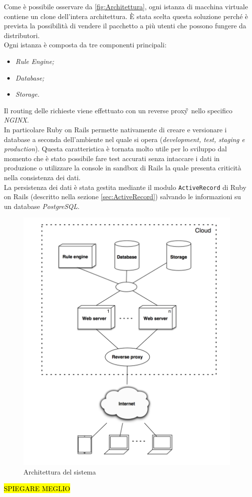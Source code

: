 Come è possibile osservare da \autoref{fig:Architettura}, ogni istanza di macchina virtuale contiene un clone dell'intera architettura. È stata scelta questa soluzione perché è prevista la possibilità di vendere il pacchetto a più utenti che possono fungere da distributori.\\
Ogni istanza è composta da tre componenti principali:
\begin{itemize}
	\item \textit{Rule Engine;}
	\item \textit{Database;}
	\item \textit{Storage.}
\end{itemize}
Il routing delle richieste viene effettuato con un \gls{reverse proxy}\G\, nello specifico \textit{NGINX}. \\
In particolare Ruby on Rails permette nativamente di creare e versionare i database a seconda dell'ambiente nel quale si opera (\textit{development, test, staging e production}). Questa caratteristica è tornata molto utile per lo sviluppo dal momento che è stato possibile fare test accurati senza intaccare i dati in produzione o utilizzare la console in sandbox di Rails la quale presenta criticità nella consistenza dei dati. \\
La persistenza dei dati è stata gestita mediante il modulo \texttt{ActiveRecord} di Ruby on Rails (descritto nella sezione \ref{sec:ActiveRecord}) salvando le informazioni su un database \textit{ PostgreSQL}.
\begin{figure}[H]
	\begin{center}
		\includegraphics[width=12cm]{Pics/architettura.png}
		\caption{Architettura del sistema}
		\label{fig:Architettura}
	\end{center}
\end{figure}
\hl{SPIEGARE MEGLIO}

